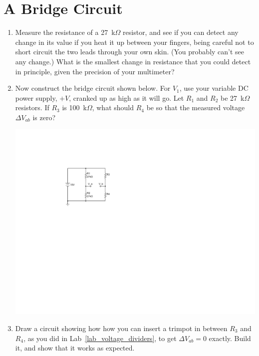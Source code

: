 \section{A Bridge Circuit}
\label{lab_bridge}


\bigskip

\begin{enumerate}[wide]

\item Measure the resistance of a 27~k$\Omega$ resistor, and see if you can detect any change in its value if you heat it up between your fingers, being careful not to short circuit the two leads through your own skin.  (You probably can't see any change.)  What is the smallest change in resistance that you could detect in principle, given the precision of your multimeter?

\item Now construct the bridge circuit shown below.  For $V_1$, use your variable DC power supply, $+V$, cranked up as high as it will go.  Let $R_1$ and $R_2$ be 27~k$\Omega$ resistors.  If $R_3$ is 100~k$\Omega$, what should $R_4$ be so that the measured voltage $\Delta V_{ab}$ is zero?  

\begin{center}
\vspace{0.1in}
\includegraphics{bridge_circuit/bridge.pdf}
\end{center}

\item Draw a circuit showing how how you can insert a trimpot in between $R_3$ and $R_4$, as you did in Lab~\ref{lab_voltage_dividers}, to get $\Delta V_{ab} = 0$ exactly.  Build it, and show that it works as expected.
	

\end{enumerate}
